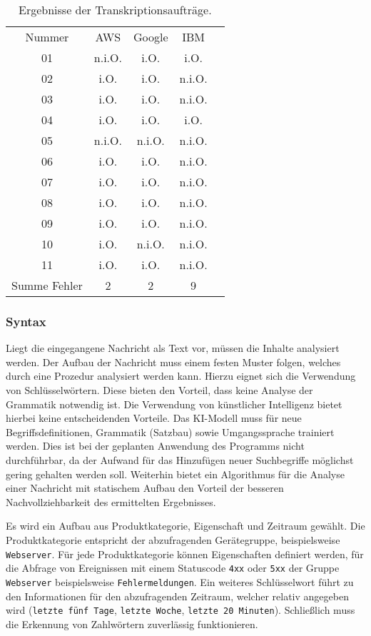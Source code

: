 \begin{table}[hb!]
\centering
\begin{tabular}{ccccc}
Nummer 		& AWS	& Google		& IBM \\
01			& n.i.O.	& i.O.		& i.O. \\
02			& i.O.	& i.O.		& n.i.O. \\
03			& i.O.	& i.O.		& n.i.O. \\
04			& i.O.	& i.O.		& i.O. \\
05			& n.i.O.	& n.i.O.		& n.i.O. \\
06			& i.O.	& i.O.		& n.i.O. \\
07			& i.O.	& i.O.		& n.i.O. \\
08			& i.O.	& i.O.		& n.i.O. \\
09			& i.O.	& i.O.		& n.i.O. \\
10			& i.O.	& n.i.O.		& n.i.O. \\
11			& i.O.	& i.O.		& n.i.O. \\
\hline
Summe Fehler	& 2		& 2			& 9
\end{tabular}
\caption{Ergebnisse der Transkriptionsaufträge.}
\label{tab:erg-transkript}
\end{table}

\FloatBarrier

\subsubsection{Syntax}
\label{sec:syntax}

Liegt die eingegangene Nachricht als Text vor, müssen die Inhalte analysiert werden. Der Aufbau der Nachricht muss einem festen Muster folgen, welches durch eine Prozedur analysiert werden kann. Hierzu eignet sich die Verwendung von Schlüsselwörtern. Diese bieten den Vorteil, dass keine Analyse der Grammatik notwendig ist. Die Verwendung von künstlicher Intelligenz bietet hierbei keine entscheidenden Vorteile. Das KI-Modell muss für neue Begriffsdefinitionen, Grammatik (Satzbau) sowie Umgangssprache trainiert werden. Dies ist bei der geplanten Anwendung des Programms nicht durchführbar, da der Aufwand für das Hinzufügen neuer Suchbegriffe möglichst gering gehalten werden soll. Weiterhin bietet ein Algorithmus für die Analyse einer Nachricht mit statischem Aufbau den Vorteil der besseren Nachvollziehbarkeit des ermittelten Ergebnisses.

Es wird ein Aufbau aus Produktkategorie, Eigenschaft und Zeitraum gewählt. Die Produktkategorie entspricht der abzufragenden Gerätegruppe, beispielsweise \lstinline{Webserver}. Für jede Produktkategorie können Eigenschaften definiert werden, für die Abfrage von Ereignissen mit einem Statuscode \lstinline{4xx} oder \lstinline{5xx} der Gruppe \lstinline{Webserver} beispielsweise \lstinline{Fehlermeldungen}. Ein weiteres Schlüsselwort führt zu den Informationen für den abzufragenden Zeitraum, welcher relativ angegeben wird (\lstinline{letzte fünf Tage}, \lstinline{letzte Woche}, \lstinline{letzte 20 Minuten}). Schließlich muss die Erkennung von Zahlwörtern zuverlässig funktionieren.

